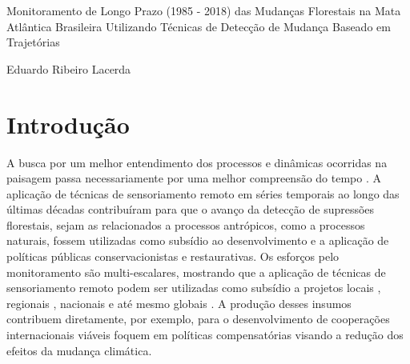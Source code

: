 \documentclass[12pt,a4paper]{article}
\begin{document}

\begin{titlepage}
    \centering
    \vspace*{\fill}

    \vspace*{0.5cm}

    \Large%
    Monitoramento de Longo Prazo (1985 - 2018) das Mudanças Florestais na Mata Atlântica Brasileira Utilizando Técnicas de Detecção de Mudança Baseado em Trajetórias

    \vspace*{5cm}

    \large Eduardo Ribeiro Lacerda

    \vspace*{\fill}
\end{titlepage}

\newpage
\tableofcontents

\newpage
\listoffigures

\newpage

\section{Introdução}
\hspace{13pt} A busca por um melhor entendimento dos processos e dinâmicas ocorridas na paisagem passa necessariamente por uma melhor compreensão do tempo \citep{gregory85}. 
A aplicação de técnicas de sensoriamento remoto em séries temporais ao longo das últimas décadas contribuíram para que o avanço da detecção de supressões florestais, sejam as relacionados a processos antrópicos, como a processos naturais, fossem utilizadas como subsídio ao desenvolvimento e a aplicação de políticas públicas conservacionistas e restaurativas. Os esforços pelo monitoramento são multi-escalares, mostrando que a aplicação de técnicas de sensoriamento remoto podem ser utilizadas como subsídio a projetos locais \citep{rs12111815}, regionais \citep{Vancutsemeabe1603, silva_junior_brazilian_2021, brandt_unexpectedly_2020}, nacionais \citep{rs12111790} e até mesmo globais \citep{Hansen850, crowther_mapping_2015, POTAPOV2021112165}. A produção desses insumos contribuem diretamente, por exemplo, para o desenvolvimento de cooperações internacionais viáveis foquem em políticas compensatórias visando a redução dos efeitos da mudança climática. 
\end{document}
